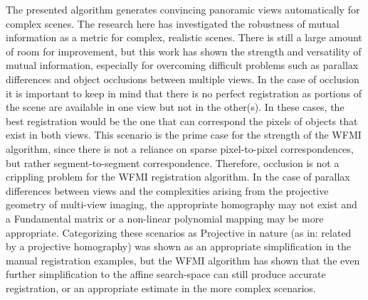 %
%
%
%
%
%
%
%
%

%
%
%



The presented algorithm generates convincing panoramic views automatically for complex scenes. The research here has investigated the robustness of mutual information as a metric for complex, realistic scenes. There is still a large amount of room for improvement, but this work has shown the strength and versatility of mutual information, especially for overcoming difficult problems such as parallax differences and object occlusions between multiple views. In the case of occlusion it is important to keep in mind that there is no perfect registration as portions of the scene are available in one view but not in the other(s). In these cases, the best registration would be the one that can correspond the pixels of objects that exist in both views. This scenario is the prime case for the strength of the WFMI algorithm, since there is not a reliance on sparse pixel-to-pixel correspondences, but rather segment-to-segment correspondence. Therefore, occlusion is not a crippling problem for the WFMI registration algorithm. In the case of parallax differences between views and the complexities arising from the projective geometry of multi-view imaging, the appropriate homography may not exist and a Fundamental matrix or a non-linear polynomial mapping may be more appropriate. Categorizing these scenarios as Projective in nature (as in: related by a projective homography) was shown as an appropriate simplification in the manual registration examples, but the WFMI algorithm has shown that the even further simplification to the affine search-space can still produce accurate registration, or an appropriate estimate in the more complex scenarios.

